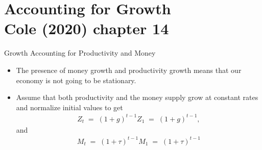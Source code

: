 \documentclass[10pt,c,aspectratio=1610,handout]{beamer}
\begin{document}
\section{Accounting for Growth\\{\small Cole (2020) chapter 14}}%
\begin{frame}{Growth Accounting for Productivity and Money}%
  \begin{itemize}%
    \item[$\blacktriangleright$] The presence of money growth and productivity growth means that our economy is not going to be stationary.%
    \pause%
    \item[$\blacktriangleright$] Assume that both productivity and the money supply grow at constant rates and normalize initial values to get%
    \begin{align*}%
      Z_{t} \; = \; (1+g)^{t-1} Z_1 \; = \; (1+g)^{t-1},%
    \end{align*}%
    and%
    \begin{align*}%
      M_{t} \; = \; (1+\tau )^{t-1} M_1 \; = \; (1+\tau )^{t-1}%
    \end{align*}%
  \end{itemize}%
\end{frame}%
\end{document}
